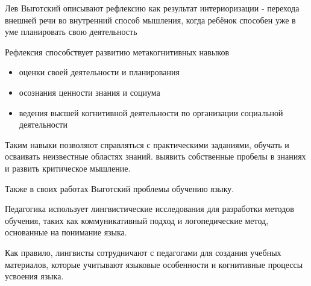 Лев Выготский описывают рефлексию как результат интериоризации -
перехода внешней речи во внутренний способ мышления, когда ребёнок способен уже в уме планировать свою деятельность 

Рефлексия способствует развитию метакогнитивных навыков \begin{itemize}
    \item оценки своей деятельности и планирования
    \item осознания ценности знания и социума
    \item ведения высшей когнитивной деятельности по организации социальной деятельности
\end{itemize}
Таким навыки позволяют справляться с практическими заданиями, обучать и осваивать неизвестные областях знаний.
выявить собственные пробелы в знаниях и развить критическое мышление.

Также в своих работах Выготский проблемы обучению языку.

Педагогика использует лингвистические исследования для разработки методов обучения, 
таких как коммуникативный подход и логопедические метод, основанные на понимание языка.

Как правило, лингвисты сотрудничают с педагогами для создания учебных материалов, которые учитывают языковые особенности и когнитивные процессы усвоения языка.










